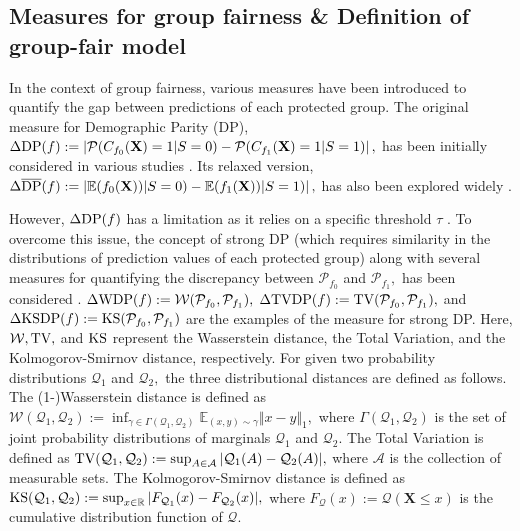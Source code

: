 \documentclass[10pt]{article} %
\begin{document}
\subsection{Measures for group fairness \& Definition of group-fair model}\label{sec:fairness}

In the context of group fairness, various measures have been introduced to quantify the gap between predictions of each protected group.
The original measure for Demographic Parity (DP), $ \Delta \textup{DP} (f) := \left\vert \mathcal{P}(C_{f_{0}}(\mathbf{X}) = 1 | S = 0) - \mathcal{P}(C_{f_{1}}(\mathbf{X}) = 1 | S = 1) \right\vert,$ has been initially considered in various studies \citep{calders2009building, feldman2015certifying, donini2018empirical, ADW19, zafar2019fairness}.
Its relaxed version, $ \Delta \overline{\textup{DP}} (f) := \left\vert \mathbb{E}(f_{0}(\mathbf{X})) | S = 0) - \mathbb{E}(f_{1}(\mathbf{X})) | S = 1) \right\vert,$ has also been explored widely \citep{Madras2018LearningAF, chuang2021fair, pmlr-v162-kim22b}.

However,  $\Delta \textup{DP} (f)$ has a limitation as it relies on a specific threshold $\tau$ \citep{Silvia_Ray_Tom_Aldo_Heinrich_John_2020}.
To overcome this issue, the concept of strong DP (which requires similarity in the distributions of prediction values of each protected group) along with several measures for quantifying the discrepancy between $\mathcal{P}_{f_{0}}$ and $\mathcal{P}_{f_{1}},$ has been considered \citep{pmlr-v115-jiang20a, NEURIPS2020_51cdbd26, Silvia_Ray_Tom_Aldo_Heinrich_John_2020, barata2021fair}.
$ \Delta \textup{WDP} (f) := \mathcal{W} (\mathcal{P}_{f_{0}}, \mathcal{P}_{f_{1}}), $
$ \Delta \textup{TVDP} (f) := \textup{TV} (\mathcal{P}_{f_{0}}, \mathcal{P}_{f_{1}}), $
and
$ \Delta \textup{KSDP} (f) := \textup{KS} (\mathcal{P}_{f_{0}}, \mathcal{P}_{f_{1}}) $
are the examples of the measure for strong DP.
Here, $\mathcal{W}, \textup{TV},$ and $\textup{KS}$ represent the Wasserstein distance, the Total Variation, and the Kolmogorov-Smirnov distance, respectively.
For given two probability distributions $\mathcal{Q}_{1}$ and $\mathcal{Q}_{2},$ the three distributional distances are defined as follows.
The (1-)Wasserstein distance is defined as
$\mathcal{W}(\mathcal{Q}_{1}, \mathcal{Q}_{2}) := \inf_{\gamma \in \Gamma(\mathcal{Q}_{1}, \mathcal{Q}_{2})} \mathbb{E}_{(x, y) \sim \gamma} \Vert x - y \Vert_{1},$
where $\Gamma(\mathcal{Q}_{1}, \mathcal{Q}_{2})$ is the set of joint probability distributions of marginals $\mathcal{Q}_{1}$ and $\mathcal{Q}_{2}.$
The Total Variation is defined as
$\textup{TV}(\mathcal{Q}_{1}, \mathcal{Q}_{2}) := \sup_{A \in \mathcal{A}} \vert \mathcal{Q}_{1} (A) - \mathcal{Q}_{2} (A) \vert,$
where $\mathcal{A}$ is the collection of measurable sets.
The Kolmogorov-Smirnov distance is defined as
$\textup{KS}(\mathcal{Q}_{1}, \mathcal{Q}_{2}) := \sup_{x \in \mathbb{R}} \vert F_{\mathcal{Q}_{1}} (x) - F_{\mathcal{Q}_{2}} (x) \vert,$
where $F_{\mathcal{Q}}(x) := \mathcal{Q}(\mathbf{X} \le x)$ is the cumulative distribution function of $\mathcal{Q}.$
\end{document}

